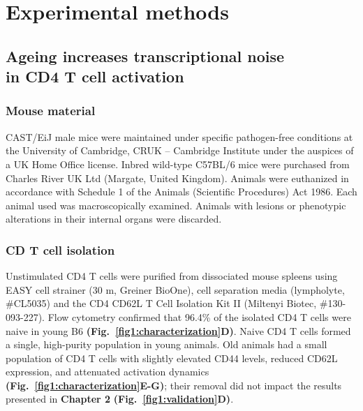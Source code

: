 
\chapter{Experimental methods} 

\section{Ageing increases transcriptional noise \\
in CD4\plus{} T cell activation}
\label{appA.1}

\subsection{Mouse material}

CAST/EiJ male mice were maintained under specific pathogen-free conditions at the University of Cambridge, CRUK – Cambridge Institute under the auspices of a UK Home Office license. Inbred wild-type C57BL/6 mice were purchased from Charles River UK Ltd (Margate, United Kingdom). Animals were euthanized in accordance with Schedule 1 of the Animals (Scientific Procedures) Act 1986. Each animal used was macroscopically examined. Animals with lesions or phenotypic alterations in their internal organs were discarded. 

\subsection{CD\plus{} T cell isolation}
\label{appA.1:isolation}

Unstimulated CD4\plus{} T cells were purified from dissociated mouse spleens using EASY cell strainer (30 \textmu{}m, Greiner BioOne), cell separation media (lympholyte, \#{}CL5035) and the CD4\plus{} CD62L\plus{} T Cell Isolation Kit II (Miltenyi Biotec, \#{}130-093-227). Flow cytometry confirmed that 96.4\% of the isolated CD4\plus{} T cells were naive in young B6 \textbf{(Fig.~\ref{fig1:characterization}D)}. Naive CD4\plus{} T cells formed a single, high-purity population in young animals. Old animals had a small population of CD4\plus{} T cells with slightly elevated CD44 levels, reduced CD62L expression, and attenuated activation dynamics \textbf{(Fig.~\ref{fig1:characterization}E-G)}; their removal did not impact the results presented in \textbf{Chapter 2} \textbf{(Fig.~\ref{fig1:validation}D)}.\\

